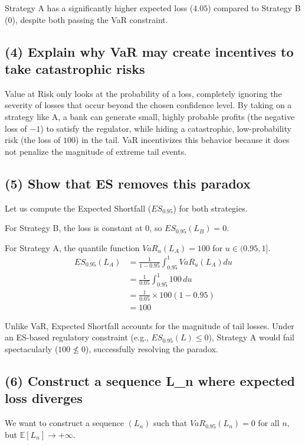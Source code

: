 Strategy A has a significantly higher expected loss ($4.05$) compared to Strategy B ($0$), despite both passing the VaR constraint.


\subsection{(4) Explain why VaR may create incentives to take catastrophic risks}

Value at Risk only looks at the probability of a loss, completely ignoring the severity of losses that occur beyond the chosen confidence level. By taking on a strategy like A, a bank can generate small, highly probable profits (the negative loss of $-1$) to satisfy the regulator, while hiding a catastrophic, low-probability risk (the loss of $100$) in the tail. VaR incentivizes this behavior because it does not penalize the magnitude of extreme tail events.


\subsection{(5) Show that ES removes this paradox}

Let us compute the Expected Shortfall ($ES_{0.95}$) for both strategies.

For Strategy B, the loss is constant at 0, so $ES_{0.95}(L_B) = 0$.

For Strategy A, the quantile function $VaR_u(L_A) = 100$ for $u \in (0.95, 1]$.
\begin{align*}
ES_{0.95}(L_A) &= \frac{1}{1 - 0.95} \int_{0.95}^1 VaR_u(L_A) du \\
&= \frac{1}{0.05} \int_{0.95}^1 100 \, du \\
&= \frac{1}{0.05} \times 100(1 - 0.95) \\
&= 100
\end{align*}

Unlike VaR, Expected Shortfall accounts for the magnitude of tail losses. Under an ES-based regulatory constraint (e.g., $ES_{0.95}(L) \le 0$), Strategy A would fail spectacularly ($100 \not\le 0$), successfully resolving the paradox.


\subsection{(6) Construct a sequence L\_n where expected loss diverges}

We want to construct a sequence $(L_n)$ such that $VaR_{0.95}(L_n) = 0$ for all $n$, but $\mathbb{E}[L_n] \rightarrow +\infty$.

